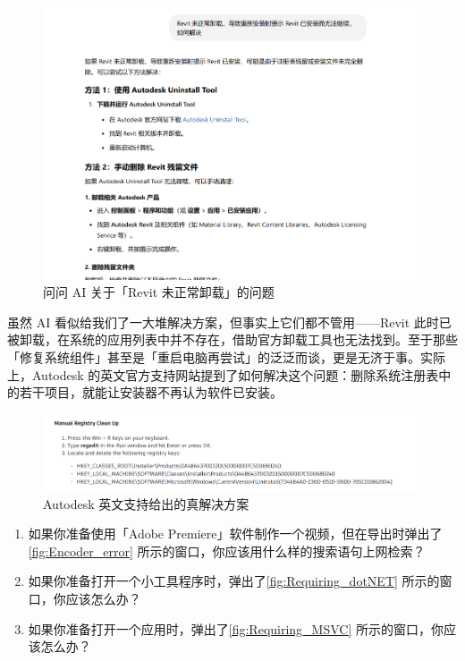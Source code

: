 \begin{figure}[htb!]
  \centering
  \includegraphics[width=.7\textwidth]{assets/basic/Reinstall_Revit.png}
  \caption{问问 AI 关于「Revit 未正常卸载」的问题}
  \label{fig:Reinstall_Revit}
\end{figure}

虽然 AI 看似给我们了一大堆解决方案，但事实上它们都不管用——Revit 此时已被卸载，在系统的应用列表中并不存在，借助官方卸载工具也无法找到。至于那些「修复系统组件」甚至是「重启电脑再尝试」的泛泛而谈，更是无济于事。实际上，Autodesk 的英文官方支持网站提到了如何解决这个问题：删除系统注册表中的若干项目，就能让安装器不再认为软件已安装。

\begin{figure}[htb!]
  \centering
  \includegraphics[width=.9\textwidth]{assets/basic/Completely_remove_Revit_registry.png}
  \caption{Autodesk 英文支持给出的真解决方案}
  \label{fig:Completely_remove_Revit_registry}
\end{figure}

\practice

\begin{enumerate}
  \item 如果你准备使用「Adobe Premiere」软件制作一个视频，但在导出时弹出了\autoref{fig:Encoder_error} 所示的窗口，你应该用什么样的搜索语句上网检索？
  \item 如果你准备打开一个小工具程序时，弹出了\autoref{fig:Requiring_dotNET} 所示的窗口，你应该怎么办？
  \item 如果你准备打开一个应用时，弹出了\autoref{fig:Requiring_MSVC} 所示的窗口，你应该怎么办？
\end{enumerate}

